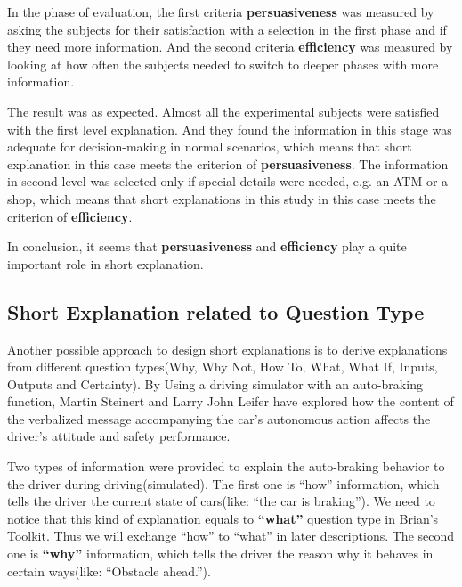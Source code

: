     \indent In the phase of evaluation, the first criteria \textbf{persuasiveness} was measured by asking the subjects 
    for their satisfaction with a selection in the first phase and if they need more information. And the second criteria \textbf{efficiency} 
    was measured by looking at how often the subjects needed to switch to deeper phases with more information.

    \indent The result was as expected. Almost all the experimental subjects were satisfied with the first level explanation.
    And they found the information in this stage was adequate for decision-making in normal scenarios, which means that short explanation
    in this case meets the criterion of \textbf{persuasiveness}. The information in second level was selected 
    only if special details were needed, e.g. an ATM or a shop, which means that short explanations in this study in this case meets
    the criterion of \textbf{efficiency}.
    
    \indent In conclusion, it seems that \textbf{persuasiveness} and
    \textbf{efficiency} play a quite important role in short explanation.

    \subsection{Short Explanation related to Question Type}
    
    \indent Another possible approach to design short explanations 
    is to derive explanations from different question types(Why, Why Not, How To, What, What If, Inputs, Outputs and Certainty).
    By Using a driving simulator with an auto-braking function, 
    Martin Steinert and Larry John Leifer have explored how the content of the verbalized message accompanying the car’s autonomous action 
    affects the driver’s attitude and safety performance\cite{koo2015did}.

    \indent Two types of information were provided to explain the auto-braking behavior to the driver during driving(simulated).
    The first one is ``how'' information, which tells the driver the current state of cars(like: ``the car is braking'').
    We need to notice that this kind of explanation equals to \textbf{``what''} question type in Brian's Toolkit\cite{lim2010toolkit}. Thus we will exchange ``how'' to ``what'' in later descriptions. 
    The second one is \textbf{``why''} information, which tells the driver the reason why it behaves in certain ways(like: ``Obstacle ahead.'').  
    
